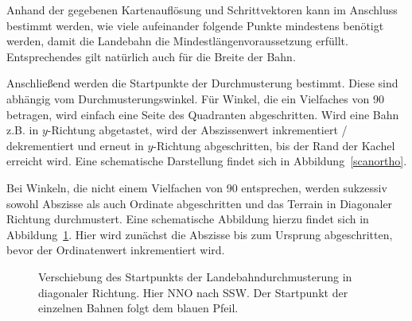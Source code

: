 \documentclass[10pt,a4paper]{report}
\begin{document}
Anhand der gegebenen Kartenauflösung und Schrittvektoren kann im Anschluss bestimmt werden, wie viele aufeinander folgende Punkte mindestens benötigt werden, damit die Landebahn die Mindestlängenvoraussetzung erfüllt.
Entsprechendes gilt natürlich auch für die Breite der Bahn.

Anschließend werden die Startpunkte der Durchmusterung bestimmt.
Diese sind abhängig vom Durchmusterungswinkel. 
Für Winkel, die ein Vielfaches von 90 betragen, wird einfach eine Seite des Quadranten abgeschritten. Wird eine Bahn z.B. in $y$-Richtung abgetastet, wird der Abszissenwert inkrementiert / dekrementiert und erneut in $y$-Richtung abgeschritten, bis der Rand der Kachel erreicht wird. Eine schematische Darstellung findet sich in Abbildung~\ref{scanortho}.

Bei Winkeln, die nicht einem Vielfachen von 90 entsprechen, werden sukzessiv sowohl Abszisse als auch Ordinate abgeschritten und das Terrain in Diagonaler Richtung durchmustert. 
Eine schematische Abbildung hierzu findet sich in Abbildung~\ref{scandiagonal}. Hier wird zunächst die Abszisse bis zum Ursprung abgeschritten, bevor der Ordinatenwert inkrementiert wird.

\begin{figure}\label{scandiagonal}
\centering
{}
\caption{Verschiebung des Startpunkts der Landebahndurchmusterung in diagonaler Richtung. Hier NNO nach SSW. Der Startpunkt der einzelnen Bahnen folgt dem blauen Pfeil.}
\end{figure}
\end{document}
